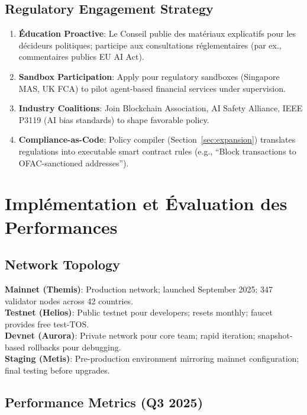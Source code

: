 \documentclass[11pt]{article}
\begin{document}
\subsection{Regulatory Engagement Strategy}

\begin{enumerate}[noitemsep]
  \item \textbf{Éducation Proactive}: Le Conseil publie des matériaux explicatifs pour les décideurs politiques; participe aux consultations réglementaires (par ex., commentaires publics EU AI Act).
  \item \textbf{Sandbox Participation}: Apply pour regulatory sandboxes (Singapore MAS, UK FCA) to pilot agent-based financial services under supervision.
  \item \textbf{Industry Coalitions}: Join Blockchain Association, AI Safety Alliance, IEEE P3119 (AI bias standards) to shape favorable policy.
  \item \textbf{Compliance-as-Code}: Policy compiler (Section~\ref{sec:expansion}) translates regulations into executable smart contract rules (e.g., ``Block transactions to OFAC-sanctioned addresses'').
\end{enumerate}

\section{Implémentation et Évaluation des Performances}
\label{sec:implementation}

\subsection{Network Topology}

\textbf{Mainnet (Themis)}: Production network; launched September 2025; 347 validator nodes across 42 countries.\\
\textbf{Testnet (Helios)}: Public testnet pour developers; resets monthly; faucet provides free test-TOS.\\
\textbf{Devnet (Aurora)}: Private network pour core team; rapid iteration; snapshot-based rollbacks pour debugging.\\
\textbf{Staging (Metis)}: Pre-production environment mirroring mainnet configuration; final testing before upgrades.

\subsection{Performance Metrics (Q3 2025)}
\end{document}
